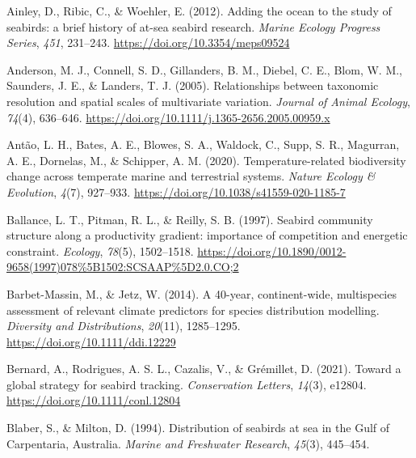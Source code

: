 \documentclass{article}
\newlength{\cslhangindent}
\newlength{\cslentryspacingunit} %
\newenvironment{CSLReferences}[2] %
 {%
  \setlength{\parindent}{0pt}
  \ifodd #1
  \let\oldpar\par
  \def\par{\hangindent=\cslhangindent\oldpar}
  \fi
  \setlength{\parskip}{#2\cslentryspacingunit}
 }%
 {}
\begin{document}
\hypertarget{refs}{}
\begin{CSLReferences}{1}{0}
\leavevmode{}%
Ainley, D., Ribic, C., \& Woehler, E. (2012). Adding the ocean to the study of seabirds: a brief history of at-sea seabird research. \emph{Marine Ecology Progress Series}, \emph{451}, 231--243. \url{https://doi.org/10.3354/meps09524}

\leavevmode{}%
Anderson, M. J., Connell, S. D., Gillanders, B. M., Diebel, C. E., Blom, W. M., Saunders, J. E., \& Landers, T. J. (2005). Relationships between taxonomic resolution and spatial scales of multivariate variation. \emph{Journal of Animal Ecology}, \emph{74}(4), 636--646. \url{https://doi.org/10.1111/j.1365-2656.2005.00959.x}

\leavevmode{}%
Antão, L. H., Bates, A. E., Blowes, S. A., Waldock, C., Supp, S. R., Magurran, A. E., Dornelas, M., \& Schipper, A. M. (2020). Temperature-related biodiversity change across temperate marine and terrestrial systems. \emph{Nature Ecology \& Evolution}, \emph{4}(7), 927--933. \url{https://doi.org/10.1038/s41559-020-1185-7}

\leavevmode{}%
Ballance, L. T., Pitman, R. L., \& Reilly, S. B. (1997). Seabird community structure along a productivity gradient: importance of competition and energetic constraint. \emph{Ecology}, \emph{78}(5), 1502--1518. \url{https://doi.org/10.1890/0012-9658(1997)078\%5B1502:SCSAAP\%5D2.0.CO;2}

\leavevmode{}%
Barbet-Massin, M., \& Jetz, W. (2014). A 40-year, continent-wide, multispecies assessment of relevant climate predictors for species distribution modelling. \emph{Diversity and Distributions}, \emph{20}(11), 1285--1295. \url{https://doi.org/10.1111/ddi.12229}

\leavevmode{}%
Bernard, A., Rodrigues, A. S. L., Cazalis, V., \& Grémillet, D. (2021). Toward a global strategy for seabird tracking. \emph{Conservation Letters}, \emph{14}(3), e12804. \url{https://doi.org/10.1111/conl.12804}

\leavevmode{}%
Blaber, S., \& Milton, D. (1994). Distribution of seabirds at sea in the {G}ulf of {C}arpentaria, {A}ustralia. \emph{Marine and Freshwater Research}, \emph{45}(3), 445--454.


\end{CSLReferences}
\end{document}
